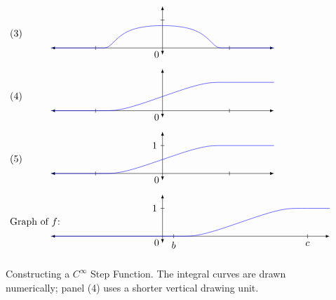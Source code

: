 \documentclass[../../main]{subfiles}
\begin{document}
\begin{figure}[p!]
\[\begin{tikzpicture}[x=0.8cm]
    \begin{scope}[shift={(0,-6.75)}]
    \draw (-7,0.5) node[anchor=west] {(3)};
    \draw[latex-latex]
        (-5,0)--
        (0,0) node[anchor=north east] {$0$} --
        (5,0);
    \draw[latex-latex] (0,-0.25)--(0,1.5) ;
    \draw (2pt,1)--(-2pt,1) node[anchor=east] {};
    
    \draw (-3,2pt)--(-3,-2pt);
    \draw (3,2pt)--(3,-2pt);
    
    \draw[blue] (-5,0)--(-3,0);
    \draw[blue, domain=-2.99:2.99, samples=100]
    plot (\x, {exp(-1/pow(3+\x,2))*exp(-1/pow(3-\x,2)) } );
    \draw[blue] (3,0)--(5,0);
    \end{scope}
    
    \begin{scope}[shift={(0,-9)}]
    \draw (-7,0.5) node[anchor=west] {(4)};
    \draw[latex-latex]
        (-5,0)--
        (0,0) node[anchor=north east] {$0$} --
        (5,0);
    \draw[latex-latex] (0,-0.25)--(0,1.5);
    
    \draw (-3,2pt)--(-3,-2pt);
    \draw (3,2pt)--(3,-2pt);
    
    \draw[blue,yscale=1.01684875129] \hicksStepPath;
    \draw[blue] (-5,0)--(-3,0);
    \draw[blue] (3,1.01684875129)--(5,1.01684875129);
    \end{scope}
    
    \begin{scope}[shift={(0,-11.25)}]
    \draw (-7,0.5) node[anchor=west] {(5)};
    \draw[latex-latex]
        (-5,0)--
        (0,0) node[anchor=north east] {$0$} --
        (5,0);
    \draw[latex-latex] (0,-0.25)--(0,1.5) ;
    \draw (2pt,1)--(-2pt,1) node[anchor=east] {$1$};
    
    \draw (-3,2pt)--(-3,-2pt);
    \draw (3,2pt)--(3,-2pt);
    
    \draw[blue] \hicksStepPath;
    \draw[blue] (-5,0)--(-3,0);
    \draw[blue] (3,1)--(5,1);
    \end{scope}
    
    \begin{scope}[shift={(0,-13.5)}]
    \draw (-7,0.5) node[anchor=west] {Graph of $f$:};
    \draw[latex-latex]
        (-5,0)--
        (0,0) node[anchor=north east] {$0$} --
        (7.5,0);
    \draw[latex-latex] (0,-0.25)--(0,1.5) ;
    \draw (2pt,1)--(-2pt,1) node[anchor=east] {$1$};
    
    \draw (0.5,2pt)--(0.5,-2pt) node[anchor=north] {$b$};
    \draw (6.5,2pt)--(6.5,-2pt) node[anchor=north] {$c$};

    \draw[blue,xshift=2.8cm] \hicksStepPath;
    \draw[blue] (-5,0)--(0.5,0);
    \draw[blue] (6.5,1)--(7.5,1);
    \end{scope}
\end{tikzpicture}
\]
\caption{Constructing a $C^\infty$ Step Function. The integral curves are drawn numerically; panel (4) uses a shorter vertical drawing unit.}
\label{fig:ch06fig1}
\end{figure}
\end{document}
